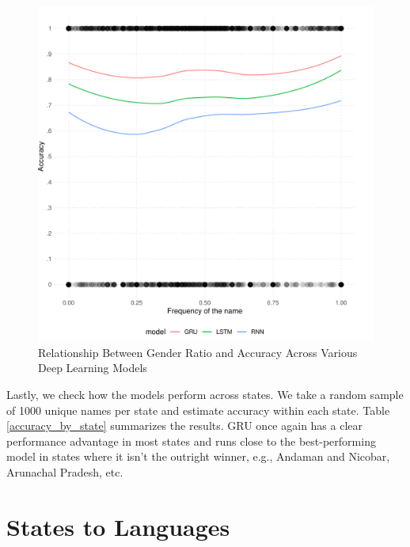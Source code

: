 \documentclass[11pt,  letterpaper]{article}
\begin{document}
\begin{figure}[!htb]

  \centering

    \caption{Relationship Between Gender Ratio and Accuracy Across Various Deep Learning Models}

  \includegraphics[]{figs/gender_perf.pdf}

  \label{fig:women_accuracy}

\end{figure}

Lastly, we check how the models perform across states. We take a random sample of 1000 unique names per state and estimate accuracy within each state. Table \ref{accuracy_by_state} summarizes the results. GRU once again has a clear performance advantage in most states and runs close to the best-performing model in states where it isn't the outright winner, e.g., Andaman and Nicobar, Arunachal Pradesh, etc.




\section{States to Languages}
\end{document}
